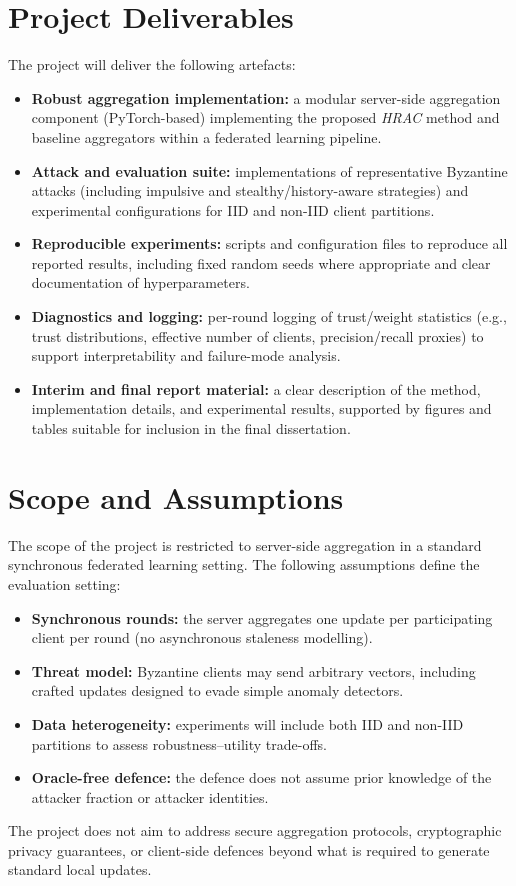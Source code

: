 \section{Project Deliverables}
The project will deliver the following artefacts:
\begin{itemize}
    \item \textbf{Robust aggregation implementation:} a modular server-side aggregation component (PyTorch-based) implementing the proposed \emph{HRAC} method and baseline aggregators within a federated learning pipeline.
    \item \textbf{Attack and evaluation suite:} implementations of representative Byzantine attacks (including impulsive and stealthy/history-aware strategies) and experimental configurations for IID and non-IID client partitions.
    \item \textbf{Reproducible experiments:} scripts and configuration files to reproduce all reported results, including fixed random seeds where appropriate and clear documentation of hyperparameters.
    \item \textbf{Diagnostics and logging:} per-round logging of trust/weight statistics (e.g., trust distributions, effective number of clients, precision/recall proxies) to support interpretability and failure-mode analysis.
    \item \textbf{Interim and final report material:} a clear description of the method, implementation details, and experimental results, supported by figures and tables suitable for inclusion in the final dissertation.
\end{itemize}

\section{Scope and Assumptions}
The scope of the project is restricted to server-side aggregation in a standard synchronous federated learning setting. The following assumptions define the evaluation setting:
\begin{itemize}
    \item \textbf{Synchronous rounds:} the server aggregates one update per participating client per round (no asynchronous staleness modelling).
    \item \textbf{Threat model:} Byzantine clients may send arbitrary vectors, including crafted updates designed to evade simple anomaly detectors.
    \item \textbf{Data heterogeneity:} experiments will include both IID and non-IID partitions to assess robustness--utility trade-offs.
    \item \textbf{Oracle-free defence:} the defence does not assume prior knowledge of the attacker fraction or attacker identities.
\end{itemize}
The project does not aim to address secure aggregation protocols, cryptographic privacy guarantees, or client-side defences beyond what is required to generate standard local updates.

